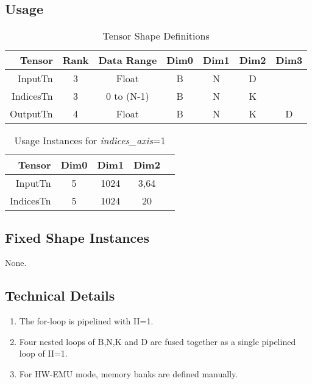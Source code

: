 \subsection{Usage}
\begin{table}[htbp] %
\caption{Tensor Shape Definitions}
\label{tab:shapes_concat}
	\begin{center}
		\begin{tabular}{|r|c|c|c|c|c|c|} 
		\hline	
		Tensor & Rank & Data Range & Dim0 & Dim1 & Dim2 & Dim3\\ 
		\hline	
		InputTn &
			3 &
			Float &
			B &
			N &
			D &
			\\ 
		\hline	
		IndicesTn &
			3 &
			0 to (N-1) &
			B &
			N &
			K &
			\\ 
		\hline
		OutputTn &
			4 &
			Float &
			B & 
			N & 
			K &
			D \\
		\hline
		\end{tabular}
	\end{center}
\end{table}

\begin{table}[htbp] %
\caption{Usage Instances for \emph{indices\_axis}=1}
\label{tab:shapes_concat}
	\begin{center}
		\begin{tabular}{|r|c|c|c|c|} 
		\hline	
		Tensor & Dim0 & Dim1 & Dim2\\ 
		\hline	
		InputTn &
			5 &
			1024 &
			3,64
			\\ 
		\hline	
		IndicesTn &
			5 &
			1024 &
			20 
			\\ 
		\hline
		\end{tabular}
	\end{center}
\end{table}

\subsection{Fixed Shape Instances}
None.

\subsection{Technical Details}
\begin{enumerate}
\item The for-loop is pipelined with II=1.
\item Four nested loops of B,N,K and D are fused together as a single pipelined loop of II=1.
\item For HW-EMU mode, memory banks are defined manually.
\end{enumerate}










